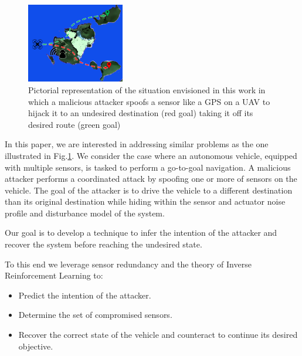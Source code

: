 \documentclass[letterpaper, 10 pt, conference]{ieeeconf}  %
\begin{document}
\begin{figure}[t]
\centering
\includegraphics[width=0.38\textwidth]{problem}
\caption{Pictorial representation of the situation envisioned in this work in which a malicious attacker spoofs a sensor like a GPS on a UAV to hijack it to an undesired destination (red goal) taking it off its desired route (green goal)}
 \label{fig:problem}
\end{figure}


In this paper, we are interested in addressing similar problems as the one illustrated in Fig.\ref{fig:problem}. We consider the case where an autonomous vehicle, equipped with multiple sensors, is tasked to perform a go-to-goal navigation. 
A malicious attacker performs a coordinated attack by spoofing one or more of sensors on the vehicle. The goal of the attacker is to drive the vehicle to a different destination than its original destination while hiding within the sensor and actuator noise profile and disturbance model of the system. 

Our goal is to develop a technique to infer the intention of the attacker and recover the system before reaching the undesired state. 


To this end we leverage sensor redundancy and the theory of Inverse Reinforcement Learning to:
\begin{itemize}
    \item Predict the intention of the attacker.
    \item Determine the set of compromised sensors.
    \item Recover the correct state of the vehicle and counteract to continue its desired objective. 
\end{itemize}
\end{document}
